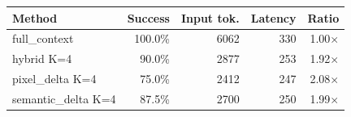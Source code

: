 \begin{tabular}{lrrrr}\toprule
Method & Success & Input tok. & Latency & Ratio \\
\midrule
full\_context & 100.0\% & 6062 & 330 & 1.00$\times$ \\
hybrid K=4 & 90.0\% & 2877 & 253 & 1.92$\times$ \\
pixel\_delta K=4 & 75.0\% & 2412 & 247 & 2.08$\times$ \\
semantic\_delta K=4 & 87.5\% & 2700 & 250 & 1.99$\times$ \\
\bottomrule
\end{tabular}
